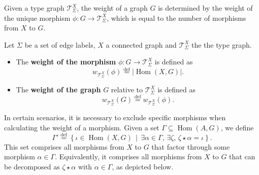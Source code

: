 Given a type graph \( \mathcal{T}_\Sigma^X\), the weight of a graph \( G \) is determined by the weight of the unique morphism \( \phi : G \to \mathcal{T}_\Sigma^X\), which is equal to the number of morphisms from \( X \) to \( G \).

\begin{definition} 
    \label{def:weight_t_sigma_x}
    Let $\Sigma$ be a set of edge labels, \( X \) a connected graph and $\mathcal{T}_\Sigma^X$ the the type graph.
    \begin{itemize}
        \item The \textbf{weight of the morphism} \( \phi : G \to \mathcal{T}_\Sigma^X\) is defined as
        \[ 
            w_{\mathcal{T}_\Sigma^X}(\phi) \overset{\operatorname{def}}{=} \left| \operatorname{Hom}(X, G) \right|.
        \]
        \item The \textbf{weight of the graph} \( G \) relative to \( \mathcal{T}_\Sigma^X\) is defined as
        \[
            w_{\mathcal{T}_\Sigma^X}(G) \overset{\operatorname{def}}{=} w_{\mathcal{T}_\Sigma^X}(\phi).
        \]
    \end{itemize}
\end{definition}

In certain scenarios, it is necessary to exclude specific morphisms when calculating the weight of a morphism. Given a set \( \Gamma \subseteq \operatorname{Hom}(A, G) \), we define\todo{}
\[
    \Gamma' \overset{\operatorname{def}}{=} \left\{ \iota \in \operatorname{Hom}(X, G) \,\middle|\, \exists \alpha \in \Gamma,\, \exists \zeta,\, \zeta \star \alpha = \iota \right\}.
\]
This set comprises all morphisms from \( X \) to \( G \) that factor through some morphism \( \alpha \in \Gamma \). Equivalently, it comprises all morphisms from \( X \) to \( G \) that can be decomposed as \( \zeta \star \alpha \) with \( \alpha \in \Gamma \), as depicted below.

\begin{center}
\end{center}

